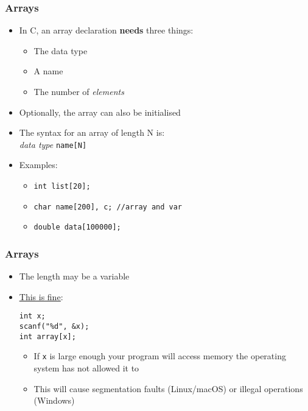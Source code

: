 \documentclass[14pt]{beamer}
\begin{document}
\begin{frame}
\frametitle{Arrays}
\begin{itemize}
\item In C, an array declaration \textbf{needs} three things:
	\begin{itemize}
		\item The data type
		\item A name
		\item The number of \textit{elements}
	\end{itemize}
\item Optionally, the array can also be initialised
\item The syntax for an array of length N is:\\
\textit{data type} \texttt{name[N]}
\item Examples:
	\begin{itemize}
		\item \texttt{int list[20];}
		\item \texttt{char name[200], c; //array and var}
		\item \texttt{double data[100000];}
	\end{itemize}
\end{itemize}
\end{frame}

\begin{frame}[fragile]
\frametitle{Arrays}
\begin{itemize}
\item The length may be a variable
\item \underline{\href{https://knowyourmeme.com/photos/962640-this-is-fine}{This is fine}}:
\begin{lstlisting}[style=CStyle]
int x;
scanf("%d", &x);
int array[x];
\end{lstlisting}
\pause
\begin{itemize}
\item If \texttt{x} is large enough your program will access memory the operating system has not allowed it to
\pause
\item This will cause segmentation faults (Linux/macOS) or illegal operations (Windows)
\end{itemize}
\end{itemize}
\end{frame}
\end{document}
